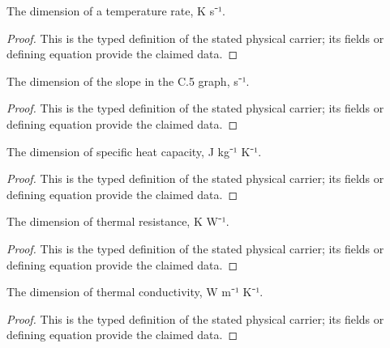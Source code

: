 \begin{definition}
  \label{def:physics:IPhO_2026_4_C_6:aux006}
  The dimension of a temperature rate, K s⁻¹.
\end{definition}
\begin{proof}
  This is the typed definition of the stated physical carrier; its fields or defining equation provide the claimed data.
\end{proof}

\begin{definition}
  \label{def:physics:IPhO_2026_4_C_6:aux007}
  The dimension of the slope in the C.5 graph, s⁻¹.
\end{definition}
\begin{proof}
  This is the typed definition of the stated physical carrier; its fields or defining equation provide the claimed data.
\end{proof}

\begin{definition}
  \label{def:physics:IPhO_2026_4_C_6:aux008}
  The dimension of specific heat capacity, J kg⁻¹ K⁻¹.
\end{definition}
\begin{proof}
  This is the typed definition of the stated physical carrier; its fields or defining equation provide the claimed data.
\end{proof}

\begin{definition}
  \label{def:physics:IPhO_2026_4_C_6:aux009}
  The dimension of thermal resistance, K W⁻¹.
\end{definition}
\begin{proof}
  This is the typed definition of the stated physical carrier; its fields or defining equation provide the claimed data.
\end{proof}

\begin{definition}
  \label{def:physics:IPhO_2026_4_C_6:aux010}
  The dimension of thermal conductivity, W m⁻¹ K⁻¹.
\end{definition}
\begin{proof}
  This is the typed definition of the stated physical carrier; its fields or defining equation provide the claimed data.
\end{proof}

